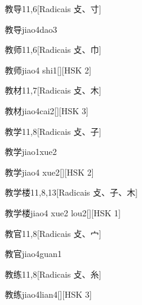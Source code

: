 \begin{entry}{教导}{11,6}[Radicais ⽁、⼨]
  \begin{phonetics}{教导}{jiao4dao3}
  \end{phonetics}
\end{entry}

\begin{entry}{教师}{11,6}[Radicais ⽁、⼱]
  \begin{phonetics}{教师}{jiao4 shi1}[][HSK 2]
  \end{phonetics}
\end{entry}

\begin{entry}{教材}{11,7}[Radicais ⽁、⽊]
  \begin{phonetics}{教材}{jiao4cai2}[][HSK 3]
  \end{phonetics}
\end{entry}

\begin{entry}{教学}{11,8}[Radicais ⽁、⼦]
  \begin{phonetics}{教学}{jiao1xue2}
  \end{phonetics}
  \begin{phonetics}{教学}{jiao4 xue2}[][HSK 2]
  \end{phonetics}
\end{entry}

\begin{entry}{教学楼}{11,8,13}[Radicais ⽁、⼦、⽊]
  \begin{phonetics}{教学楼}{jiao4 xue2 lou2}[][HSK 1]
  \end{phonetics}
\end{entry}

\begin{entry}{教官}{11,8}[Radicais ⽁、⼧]
  \begin{phonetics}{教官}{jiao4guan1}
  \end{phonetics}
\end{entry}

\begin{entry}{教练}{11,8}[Radicais ⽁、⽷]
  \begin{phonetics}{教练}{jiao4lian4}[][HSK 3]
  \end{phonetics}
\end{entry}

